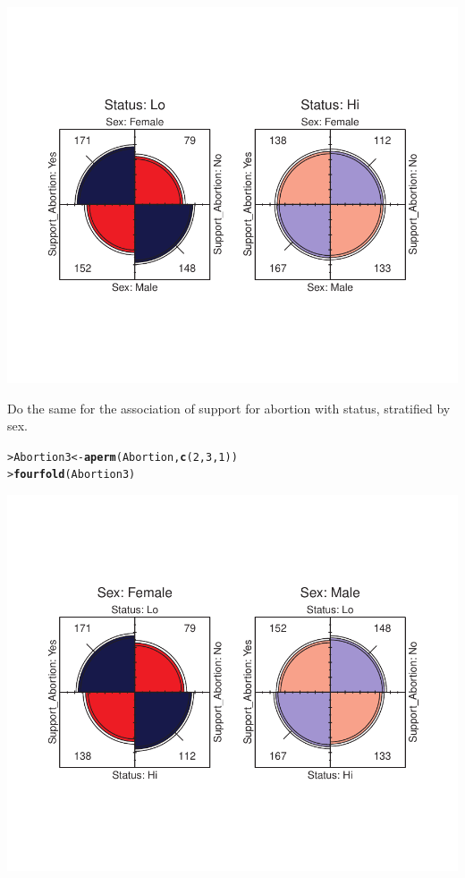 \documentclass[10pt]{report}\usepackage[]{graphicx}\usepackage[]{color}
\makeatletter
\newcommand{\hlnum}[1]{\textcolor[rgb]{0.686,0.059,0.569}{#1}}%
\newcommand{\hlstd}[1]{\textcolor[rgb]{0.345,0.345,0.345}{#1}}%
\newcommand{\hlkwb}[1]{\textcolor[rgb]{0.69,0.353,0.396}{#1}}%
\newcommand{\hlkwd}[1]{\textcolor[rgb]{0.737,0.353,0.396}{\textbf{#1}}}%
\newenvironment{kframe}{%
 \def\at@end@of@kframe{}%
 \ifinner\ifhmode%
  \def\at@end@of@kframe{\end{minipage}}%
  \begin{minipage}{\columnwidth}%
 \fi\fi%
 \def\FrameCommand##1{\hskip\@totalleftmargin \hskip-\fboxsep
 \colorbox{shadecolor}{##1}\hskip-\fboxsep
     \hskip-\linewidth \hskip-\@totalleftmargin \hskip\columnwidth}%
 \MakeFramed {\advance\hsize-\width
   \@totalleftmargin\z@ \linewidth\hsize
   \@setminipage}}%
 {\par\unskip\endMakeFramed%
 \at@end@of@kframe}
\newenvironment{knitrout}{}{} %
\renewenvironment{knitrout}{\small\renewcommand{\baselinestretch}{.85}}{} %
\makeatother
\begin{document}
\begin{Exercises}
\begin{enumerate*}
\begin{ans}
\begin{knitrout}
\centerline{\includegraphics[width=.5\textwidth]{soln/fig/ex4_2a-1} }



\end{knitrout}
    \end{ans}
    
    \item Do the same for the association of support for abortion with status, stratified
    by sex.
    \begin{ans}
\begin{knitrout}\footnotesize
{}\color{fgcolor}\begin{kframe}
\begin{alltt}
\hlstd{> }\hlstd{Abortion3}\hlkwb{<-}\hlkwd{aperm}\hlstd{(Abortion,} \hlkwd{c}\hlstd{(}\hlnum{2}\hlstd{,}\hlnum{3}\hlstd{,}\hlnum{1}\hlstd{))}
\hlstd{> }\hlkwd{fourfold}\hlstd{(Abortion3)}
\end{alltt}
\end{kframe}

\centerline{\includegraphics[width=.5\textwidth]{soln/fig/ex4_2b-1} }



\end{knitrout}
    \end{ans}
    

\end{enumerate*}
\end{Exercises}
\end{document}
